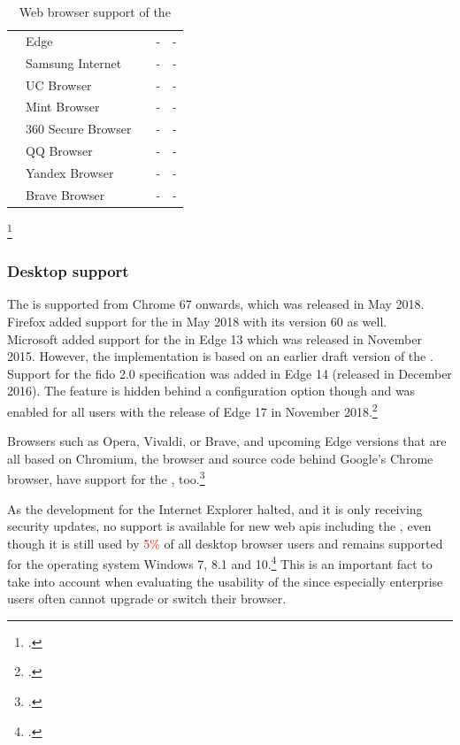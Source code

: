 \begin{table}[ht]
\begin{tabularx}{\textwidth}{l|p{5.3cm}|p{2cm}|p{1.9cm}|p{2.8cm}}
		& Edge & \NOOK & - & - \\
		& Samsung Internet & \NOOK & - & - \\
		& UC Browser & \NOOK & - & - \\
		& Mint Browser & \NOOK & - & - \\
		& 360 Secure Browser & \NOOK & - & - \\
		& QQ Browser & \NOOK & - & - \\
		& Yandex Browser & \NOOK & - & - \\
		& Brave Browser & \NOOK & - & -
	\end{tabularx}
	\caption[Web browser support of the \wa]{Web browser support of the \wa\footnotemark}
	\label{tab:browser-support}
\end{table}
\footcitetexts[Sources:][]{chrome-webauthn}{firefox-webauthn}{safari-webauthn}{chrome-android-webauthn}[a detailed analysis of Android browsers is available on the CD in the appendix.]{firefox-android-webauthn}
\newpage

\subsubsection{Desktop support}

The \wa{} is supported from Chrome 67 onwards, which was released in May 2018. Firefox added support for the \wa{} in May 2018 with its version 60 as well.\\
Microsoft added support for the \wa{} in Edge 13 which was released in November 2015. However, the implementation is based on an earlier draft version of the \wa. Support for the \gls{fido} 2.0 specification was added in Edge 14 (released in December 2016). The feature is hidden behind a configuration option though and was enabled for all users with the release of Edge 17 in November 2018.\footcite[See][112]{Jacobs:2019}

Browsers such as Opera, Vivaldi, or Brave, and upcoming Edge versions that are all based on Chromium, the browser and source code behind Google's Chrome browser, have support for the \wa, too.\footcites[See][Chapter 7.1]{kissell2019take}

As the development for the Internet Explorer halted, and it is only receiving security updates, no support is available for new web \glspl{api} including the \wa, even though it is still used by \textcolor{red}{5\%} of all desktop browser users and remains supported for the operating system Windows 7, 8.1 and 10.\footcite[See][]{ie-support}
 This is an important fact to take into account when evaluating the usability of the \wa{} since especially enterprise users often cannot upgrade or switch their browser.

